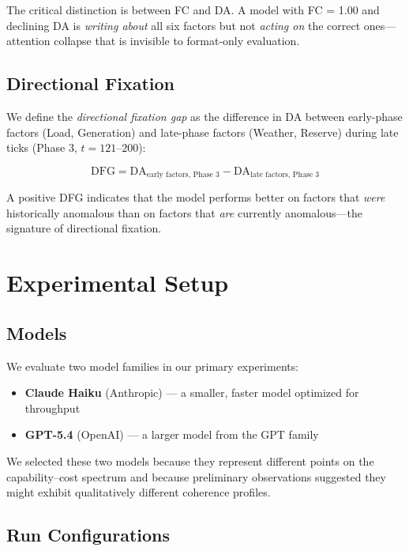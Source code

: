 \documentclass{article}
\begin{document}
The critical distinction is between FC and DA. A model with FC = 1.00
and declining DA is \emph{writing about} all six factors but not
\emph{acting on} the correct ones---attention collapse that is invisible
to format-only evaluation.

\subsection{Directional Fixation}

We define the \emph{directional fixation gap} as the difference in DA
between early-phase factors (Load, Generation) and late-phase factors
(Weather, Reserve) during late ticks (Phase 3, $t = 121$--$200$):

\begin{equation}
\text{DFG} = \text{DA}_{\text{early factors, Phase 3}} -
\text{DA}_{\text{late factors, Phase 3}}
\label{eq:dfg}
\end{equation}

A positive DFG indicates that the model performs better on factors that
\emph{were} historically anomalous than on factors that \emph{are}
currently anomalous---the signature of directional fixation.

\section{Experimental Setup}
\label{sec:setup}

\subsection{Models}

We evaluate two model families in our primary experiments:
\begin{itemize}
    \item \textbf{Claude Haiku} (Anthropic) --- a smaller, faster model
    optimized for throughput
    \item \textbf{GPT-5.4} (OpenAI) --- a larger model from the GPT
    family
\end{itemize}

We selected these two models because they represent different points on
the capability--cost spectrum and because preliminary observations
suggested they might exhibit qualitatively different coherence profiles.

\subsection{Run Configurations}
\end{document}
